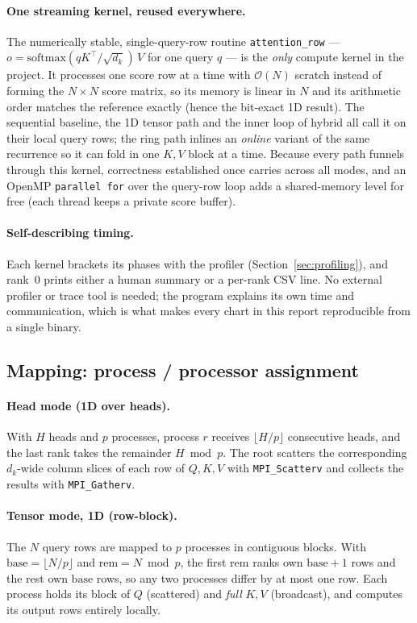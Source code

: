 \documentclass[11pt,a4paper]{article}
\newcommand{\code}[1]{\texttt{#1}}
\begin{document}
\paragraph{One streaming kernel, reused everywhere.}
The numerically stable, single-query-row routine \code{attention\_row} ---
$o=\mathrm{softmax}(qK^{\top}/\sqrt{d_k})\,V$ for one query $q$ --- is the
\emph{only} compute kernel in the project. It processes one score row at a time
with $\mathcal{O}(N)$ scratch instead of forming the $N\times N$ score matrix, so
its memory is linear in $N$ and its arithmetic order matches the reference exactly
(hence the bit-exact 1D result). The sequential baseline, the 1D tensor path and
the inner loop of hybrid all call it on their local query rows; the ring path
inlines an \emph{online} variant of the same recurrence so it can fold in one
$K,V$ block at a time. Because every path funnels through this kernel, correctness
established once carries across all modes, and an OpenMP \code{parallel for} over
the query-row loop adds a shared-memory level for free (each thread keeps a private
score buffer).

\paragraph{Self-describing timing.}
Each kernel brackets its phases with the profiler
(Section~\ref{sec:profiling}), and rank~0 prints either a human summary or a
per-rank CSV line. No external profiler or trace tool is needed; the program
explains its own time and communication, which is what makes every chart in this
report reproducible from a single binary.

\subsection{Mapping: process / processor assignment}
\label{sec:mapping}

\paragraph{Head mode (1D over heads).}
With $H$ heads and $p$ processes, process $r$ receives
$\lfloor H/p\rfloor$ consecutive heads, and the last rank takes the remainder
$H \bmod p$. The root scatters the corresponding $d_k$-wide column slices of each
row of $Q,K,V$ with \code{MPI\_Scatterv} and collects the results with
\code{MPI\_Gatherv}.

\paragraph{Tensor mode, 1D (row-block).}
The $N$ query rows are mapped to $p$ processes in contiguous blocks. With
$\text{base}=\lfloor N/p\rfloor$ and $\text{rem}=N\bmod p$, the first
$\text{rem}$ ranks own $\text{base}+1$ rows and the rest own $\text{base}$ rows,
so any two processes differ by at most one row. Each process holds its block of
$Q$ (scattered) and \emph{full} $K,V$ (broadcast), and computes its output rows
entirely locally.
\end{document}

